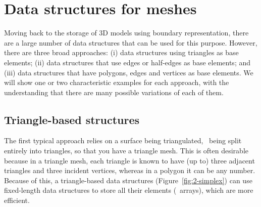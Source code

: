 \section{Data structures for meshes}

Moving back to the storage of 3D models using boundary representation, there are a large number of data structures that can be used for this purpose.
However, there are three broad approaches: (i) data structures using triangles as base elements; (ii) data structures that use edges or half-edges as base elements; and (iii) data structures that have polygons, edges and vertices as base elements.
We will show one or two characteristic examples for each approach, with the understanding that there are many possible variations of each of them.

\subsection{Triangle-based structures}

The first typical approach relies on a surface being triangulated, \ie\ being split entirely into triangles, so that you have a triangle mesh.
This is often desirable because in a triangle mesh, each triangle is known to have (up to) three adjacent triangles and three incident vertices, whereas in a polygon it can be any number.
Because of this, a triangle-based data structures (Figure~\ref{fig:2-simplex}) can use fixed-length data structures to store all their elements (\eg\ arrays), which are more efficient.

